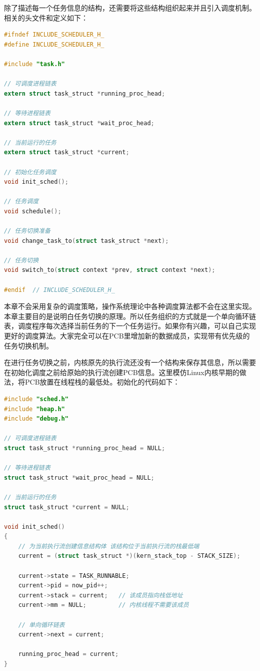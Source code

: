 \par 除了描述每一个任务信息的结构，还需要将这些结构组织起来并且引入调度机制。相关的头文件和定义如下：

\begin{lstlisting}[language = C, caption = include/sched.h]
#ifndef INCLUDE_SCHEDULER_H_
#define INCLUDE_SCHEDULER_H_

#include "task.h"

// 可调度进程链表
extern struct task_struct *running_proc_head;

// 等待进程链表
extern struct task_struct *wait_proc_head;

// 当前运行的任务
extern struct task_struct *current;

// 初始化任务调度
void init_sched();

// 任务调度
void schedule();

// 任务切换准备
void change_task_to(struct task_struct *next);

// 任务切换
void switch_to(struct context *prev, struct context *next);

#endif 	// INCLUDE_SCHEDULER_H_
\end{lstlisting}

\par 本章不会采用复杂的调度策略，操作系统理论中各种调度算法都不会在这里实现。本章主要目的是说明白任务切换的原理。所以任务组织的方式就是一个单向循环链表，调度程序每次选择当前任务的下一个任务运行。如果你有兴趣，可以自己实现更好的调度算法。大家完全可以在PCB里增加新的数据成员，实现带有优先级的任务切换机制。

\par 在进行任务切换之前，内核原先的执行流还没有一个结构来保存其信息，所以需要在初始化调度之前给原始的执行流创建PCB信息。这里模仿Linux内核早期的做法，将PCB放置在线程栈的最低处。初始化的代码如下：

\begin{lstlisting}[language = C, caption = kernel/sched/sched.c]
#include "sched.h"
#include "heap.h"
#include "debug.h"

// 可调度进程链表
struct task_struct *running_proc_head = NULL;

// 等待进程链表
struct task_struct *wait_proc_head = NULL;

// 当前运行的任务
struct task_struct *current = NULL;

void init_sched()
{
	// 为当前执行流创建信息结构体 该结构位于当前执行流的栈最低端
	current = (struct task_struct *)(kern_stack_top - STACK_SIZE);

	current->state = TASK_RUNNABLE;
	current->pid = now_pid++;
	current->stack = current; 	// 该成员指向栈低地址
	current->mm = NULL; 		// 内核线程不需要该成员

	// 单向循环链表
	current->next = current;

	running_proc_head = current;
}
\end{lstlisting}

